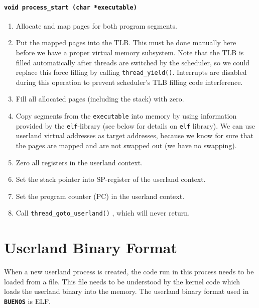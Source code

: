 \documentclass[twoside,a4paper]{report}
\makeatletter
\newenvironment{function}[3]{%
\paragraph{\texttt{#1 {\textbf{#2}} (#3)}}%
\index{#2@\texttt{#2}}%
\begin{itemize}%
}{%
\end{itemize}%
}
\newcommand{\buenos}{\texttt{\textbf{BUENOS}}}
\makeatother
\begin{document}
\begin{function}{void}{process\_start}{char *executable}
\begin{enumerate}
\item Allocate and map pages for both program segments.

\item Put the mapped pages into the TLB. This must be done manually
here before we have a proper virtual memory subsystem. Note that the TLB
is filled automatically after threads are switched by the scheduler,
so we could replace this force filling by calling
\texttt{thread\_yield()}. Interrupts are disabled during this
operation to prevent scheduler's TLB filling code interference.

\item Fill all allocated pages (including the stack) with zero.

\item Copy segments from the \texttt{executable} into memory by using
information provided by the \texttt{elf}-library (see below for
details on \texttt{elf} library). We can use userland virtual
addresses as target addresses, because we know for sure that the pages
are mapped and are not swapped out (we have no swapping).

\item Zero all registers in the userland context.

\item Set the stack pointer into SP-register of the userland context.

\item Set the program counter (PC) in the userland context.

\item Call \texttt{thread\_goto\_userland()}
,
which will never return.

\end{enumerate}

\end{function}

\section{Userland Binary Format}

When a new userland process is created, the code run in this process
needs to be loaded from a file. This file needs to be understood by
the kernel code which loads the userland binary into the memory. The
userland binary format used in \buenos{} is ELF.
\end{document}
